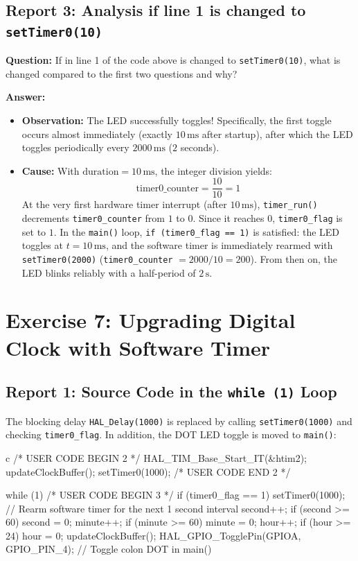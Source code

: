 \documentclass{hcmut-report}
\begin{document}
\subsection*{Report 3: Analysis if line 1 is changed to \texttt{setTimer0(10)}}
\textbf{Question:} If in line 1 of the code above is changed to \texttt{setTimer0(10)}, what is changed compared to the first two questions and why?

\textbf{Answer:}
\begin{itemize}
    \item \textbf{Observation:} The LED successfully toggles! Specifically, the first toggle occurs almost immediately (exactly $10\,\text{ms}$ after startup), after which the LED toggles periodically every $2000\,\text{ms}$ ($2$ seconds).
    \item \textbf{Cause:} With $\text{duration} = 10\,\text{ms}$, the integer division yields:
    \begin{equation}
        \text{timer0\_counter} = \frac{10}{10} = 1
    \end{equation}
    At the very first hardware timer interrupt (after $10\,\text{ms}$), \texttt{timer\_run()} decrements \texttt{timer0\_counter} from $1$ to $0$. Since it reaches $0$, \texttt{timer0\_flag} is set to $1$. In the \texttt{main()} loop, \texttt{if (timer0\_flag == 1)} is satisfied: the LED toggles at $t = 10\,\text{ms}$, and the software timer is immediately rearmed with \texttt{setTimer0(2000)} (\texttt{timer0\_counter} $= 2000 / 10 = 200$). From then on, the LED blinks reliably with a half-period of $2\,\text{s}$.
\end{itemize}

\newpage
\section{Exercise 7: Upgrading Digital Clock with Software Timer}

\subsection*{Report 1: Source Code in the \texttt{while (1)} Loop}
The blocking delay \texttt{HAL\_Delay(1000)} is replaced by calling \texttt{setTimer0(1000)} and checking \texttt{timer0\_flag}. In addition, the DOT LED toggle is moved to \texttt{main()}:
\begin{code}{c}
/* USER CODE BEGIN 2 */
HAL_TIM_Base_Start_IT(&htim2);
updateClockBuffer();
setTimer0(1000);
/* USER CODE END 2 */

while (1)
{
    /* USER CODE BEGIN 3 */
    if (timer0_flag == 1) {
        setTimer0(1000);  // Rearm software timer for the next 1 second interval
        second++;
        if (second >= 60) {
            second = 0;
            minute++;
        }
        if (minute >= 60) {
            minute = 0;
            hour++;
        }
        if (hour >= 24) {
            hour = 0;
        }
        updateClockBuffer();
        HAL_GPIO_TogglePin(GPIOA, GPIO_PIN_4);  // Toggle colon DOT in main()
    }
}
\end{code}
\end{document}
